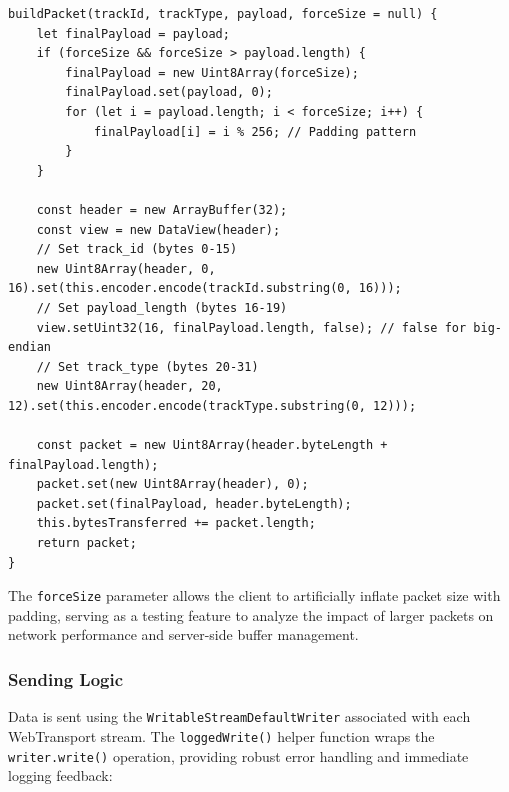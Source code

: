 \begin{lstlisting}[breaklines=true,basicstyle=\small\ttfamily,frame=single]
buildPacket(trackId, trackType, payload, forceSize = null) {
    let finalPayload = payload;
    if (forceSize && forceSize > payload.length) {
        finalPayload = new Uint8Array(forceSize);
        finalPayload.set(payload, 0);
        for (let i = payload.length; i < forceSize; i++) {
            finalPayload[i] = i % 256; // Padding pattern
        }
    }

    const header = new ArrayBuffer(32);
    const view = new DataView(header);
    // Set track_id (bytes 0-15)
    new Uint8Array(header, 0, 16).set(this.encoder.encode(trackId.substring(0, 16)));
    // Set payload_length (bytes 16-19)
    view.setUint32(16, finalPayload.length, false); // false for big-endian
    // Set track_type (bytes 20-31)
    new Uint8Array(header, 20, 12).set(this.encoder.encode(trackType.substring(0, 12)));

    const packet = new Uint8Array(header.byteLength + finalPayload.length);
    packet.set(new Uint8Array(header), 0);
    packet.set(finalPayload, header.byteLength);
    this.bytesTransferred += packet.length;
    return packet;
}
\end{lstlisting}

The \texttt{forceSize} parameter allows the client to artificially inflate packet size with padding, serving as a testing feature to analyze the impact of larger packets on network performance and server-side buffer management.

\subsubsection{Sending Logic}
Data is sent using the \texttt{WritableStreamDefaultWriter} associated with each WebTransport stream. The \texttt{loggedWrite()} helper function wraps the \texttt{writer.write()} operation, providing robust error handling and immediate logging feedback:

